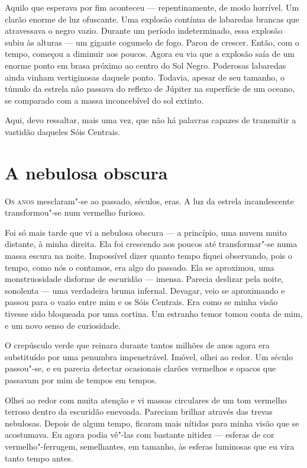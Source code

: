 Aquilo que esperava por fim aconteceu --- repentinamente, de modo horrível. Um clarão enorme de luz ofuscante. Uma
explosão contínua de labaredas brancas que atravessava o negro vazio. Durante um período indeterminado, essa explosão
subiu às alturas --- um gigante cogumelo de fogo. Parou de crescer. Então, com o tempo, começou a diminuir aos poucos.
Agora eu via que a explosão saía de um enorme ponto em brasa próximo ao centro do Sol Negro. Poderosas labaredas
ainda vinham vertiginosas daquele ponto. Todavia, apesar de seu tamanho, o túmulo da estrela não passava do reflexo
de Júpiter na superfície de um oceano, se comparado com a massa inconcebível do sol extinto.

Aqui, devo ressaltar, mais uma vez, que não há palavras capazes de transmitir a vastidão daqueles Sóis Centrais.


\clearpage

\chapter{A nebulosa obscura}


\textsc{Os anos} mesclaram"-se ao passado, séculos, eras. A luz da estrela incandescente transformou"-se num vermelho furioso.

Foi só mais tarde que vi a nebulosa obscura --- a princípio, uma nuvem muito distante, à minha direita. Ela foi crescendo
aos poucos até transformar"-se numa massa escura na noite. Impossível dizer quanto tempo fiquei observando, pois o
tempo, como nós o contamos, era algo do passado. Ela se aproximou, uma monstruosidade disforme de escuridão --- imensa.
Parecia deslizar pela noite, sonolenta --- uma verdadeira bruma infernal. Devagar, veio se aproximando e passou para o
vazio entre mim e os Sóis Centrais. Era como se minha visão tivesse sido bloqueada por uma cortina. Um estranho temor
tomou conta de mim, e um novo senso de curiosidade.

O crepúsculo verde que reinara durante tantos milhões de anos agora era substituído por uma penumbra impenetrável.
Imóvel, olhei ao redor. Um século passou"-se, e eu parecia detectar ocasionais clarões vermelhos e opacos que passavam
por mim de tempos em tempos.

Olhei ao redor com muita atenção e vi massas circulares de um tom vermelho terroso dentro da escuridão enevoada.
Pareciam brilhar através das trevas nebulosas. Depois de algum tempo, ficaram mais nítidas para minha visão que se
acostumava. Eu agora podia vê"-las com bastante nitidez --- esferas de cor vermelho"-ferrugem, semelhantes, em tamanho, às
esferas luminosas que eu vira tanto tempo antes.

